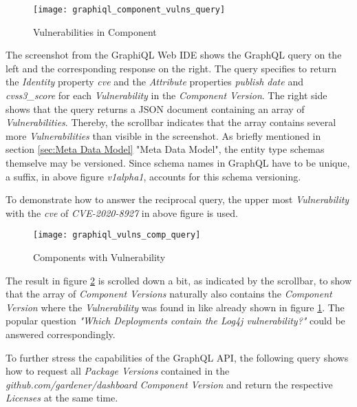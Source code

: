\begin{figure}[H]
	\centering
	\texttt{[image: graphiql\_component\_vulns\_query]}
	\caption[GraphQL Query Vulnerabilities in Component]{Vulnerabilities in Component }
	\label{fig:VulnsInComp}
\end{figure}

The screenshot from the GraphiQL Web IDE shows the GraphQL query on the left and the corresponding response on the right. The query specifies to return the \emph{Identity} property \emph{cve} and the \emph{Attribute} properties \emph{publish date} and \emph{cvss3\_score} %
for each \emph{Vulnerability} in the \emph{Component Version}. The right side shows that the query returns a JSON document containing an array of \emph{Vulnerabilities}. Thereby, the scrollbar indicates that the array contains several more \emph{Vulnerabilities} than visible in the screenshot. As briefly mentioned in section \ref{sec:Meta Data Model} "Meta Data Model", the entity type schemas themselve may be versioned. Since schema names in GraphQL have to be unique, a suffix, in above figure \emph{v1alpha1}, accounts for this schema versioning.\par 
To demonstrate how to answer the reciprocal query, the upper most \emph{Vulnerability} with the \emph{cve} of \emph{CVE-2020-8927} in above figure is used. 

\begin{figure}[H]
	\centering
	\texttt{[image: graphiql\_vulns\_comp\_query]}
	\caption[GraphQL Query Components with Vulnerability]{Components with Vulnerability }
	\label{fig:CompsWithVuln}
\end{figure}

The result in figure \ref{fig:CompsWithVuln} is scrolled down a bit, as indicated by the scrollbar, to show that the array of \emph{Component Versions} naturally also contains the \emph{Component Version} where the \emph{Vulnerability} was found in like already shown in figure \ref{fig:VulnsInComp}. The popular question \emph{"Which Deployments contain the Log4j vulnerability?"} could be answered correspondingly.\par
To further stress the capabilities of the GraphQL API, the following query shows how to request all \emph{Package Versions} contained in the \emph{github.com/gardener/dashboard} \emph{Component Version} and return the respective \emph{Licenses} at the same time.

